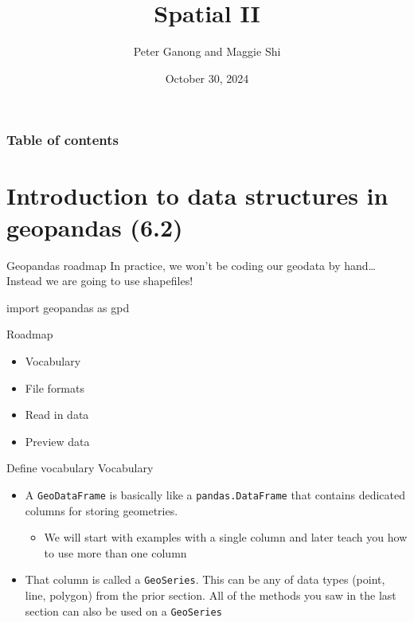 \documentclass[
  ignorenonframetext,
]{beamer}
\title{Spatial II}
\author{Peter Ganong and Maggie Shi}
\date{October 30, 2024}
\newenvironment{Shaded}{\begin{snugshade}}{\end{snugshade}}
\newcommand{\ImportTok}[1]{\textcolor[rgb]{0.00,0.46,0.62}{#1}}
\newcommand{\NormalTok}[1]{\textcolor[rgb]{0.00,0.23,0.31}{#1}}
\providecommand{\tightlist}{%
  \setlength{\itemsep}{0pt}\setlength{\parskip}{0pt}}\usepackage{longtable,booktabs,array}
\renewcommand*\contentsname{Table of contents}
\newcommand\contentsname{Table of contents}
\begin{document}
\frame{\titlepage}


\renewcommand*\contentsname{Table of contents}
\begin{frame}[allowframebreaks]
  \frametitle{Table of contents}
  \tableofcontents[hideallsubsections]
\end{frame}

\begin{frame}
\end{frame}

\section{Introduction to data structures in geopandas
(6.2)}\label{introduction-to-data-structures-in-geopandas-6.2}

\begin{frame}[fragile]{Geopandas roadmap}
\label{geopandas-roadmap}
In practice, we won't be coding our geodata by hand\ldots{} Instead we
are going to use shapefiles!

\begin{Shaded}
\begin{Highlighting}[]
\ImportTok{import}\NormalTok{ geopandas }\ImportTok{as}\NormalTok{ gpd}
\end{Highlighting}
\end{Shaded}

Roadmap

\begin{itemize}
\tightlist
\item
  Vocabulary
\item
  File formats
\item
  Read in data
\item
  Preview data
\end{itemize}
\end{frame}

\begin{frame}[fragile]{Define vocabulary}
\label{define-vocabulary}
Vocabulary

\begin{itemize}
\tightlist
\item
  A \texttt{GeoDataFrame} is basically like a \texttt{pandas.DataFrame}
  that contains dedicated columns for storing geometries.

  \begin{itemize}
  \tightlist
  \item
    We will start with examples with a single column and later teach you
    how to use more than one column
  \end{itemize}
\item
  That column is called a \texttt{GeoSeries}. This can be any of data
  types (point, line, polygon) from the prior section. All of the
  methods you saw in the last section can also be used on a
  \texttt{GeoSeries}
\end{itemize}
\end{frame}
\end{document}

